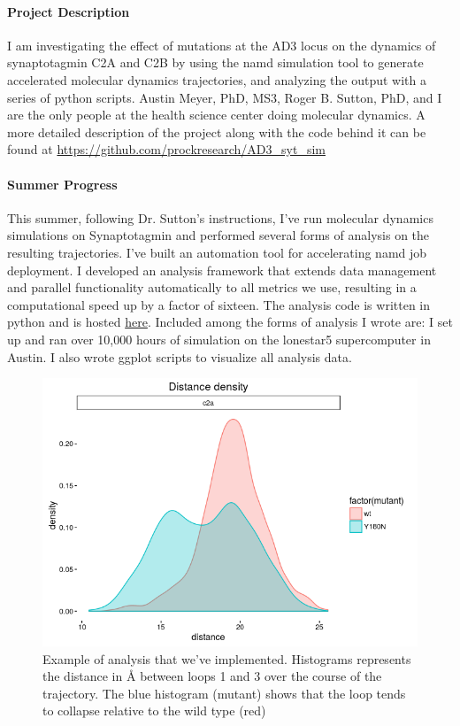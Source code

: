 \documentclass[12pt]{article}
\begin{document}

\paragraph{Project Description}
I am investigating the effect of mutations at the AD3 locus on the dynamics of synaptotagmin C2A and C2B by using
the namd simulation tool to generate accelerated molecular dynamics trajectories, and analyzing the output with a series
of python scripts. Austin Meyer, PhD, MS3, Roger B. Sutton, PhD, and I are the only people at the health science center doing molecular
dynamics.
A more detailed description of the project along with the code behind it can be found at
\url{https://github.com/prockresearch/AD3_syt_sim}

\paragraph{Summer Progress}
This summer, following Dr. Sutton's instructions, I've run molecular dynamics simulations on Synaptotagmin and performed
several forms of analysis on the resulting trajectories. I've built an automation tool for accelerating namd job deployment. I developed 
an analysis framework that extends data management and parallel functionality automatically
to all metrics we use, resulting in a computational speed up by a factor of sixteen. 
The analysis code is written in python and is hosted 
\href{https://github.com/prockresearch/AD3_syt_sim/tree/master/analysis}{here}.
Included among the forms of analysis I wrote are:
I set up and ran over 10,000 hours of simulation on the lonestar5 supercomputer in Austin.
I also wrote ggplot scripts to visualize all analysis data. 

\begin{figure}[h]
\caption{Example of analysis that we've implemented. Histograms represents the distance in {\AA} between loops 1 and 3 over the 
course of the trajectory. The blue histogram (mutant) shows
that the loop tends to collapse relative to the wild type (red)} 
\includegraphics[scale=0.8]{fig.png}
\centering
\end{figure}
\end{document}
